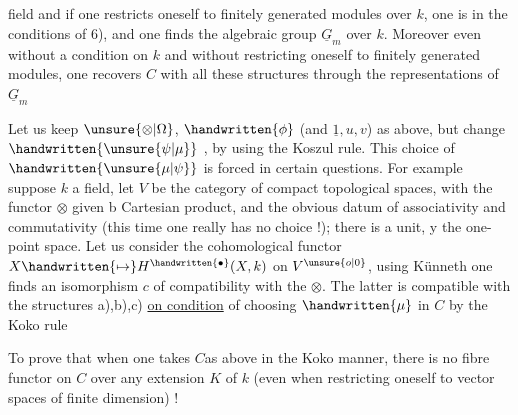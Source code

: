 

field and if one restricts oneself to finitely generated modules over $k$, one is in the conditions of 6), and one finds the algebraic group $\underline{G}_m$ over $k$. Moreover even without a condition on $k$ and without restricting oneself to finitely generated modules, one recovers $C$ with all these structures through the representations of $\underline{G}_m$\handwritten{\unsure{!|/}}

Let us keep $\unsure{\otimes|\Omega}$, $\handwritten{\phi}$ (and $\underline{1},u,v$) as above, but change $\handwritten{\unsure{\psi|\mu}}$ , by  using the Koszul rule. This choice of $\handwritten{\unsure{\mu|\psi}}$ is forced in certain questions. For example suppose $k$ a field,  let $V$ be the category of compact topological spaces, with the functor $\otimes$ given b Cartesian product, and the obvious datum of associativity and commutativity (this time one really has no choice !); there is a unit,  y the one-point space. Let us consider the cohomological functor $X\handwritten{\mapsto}H^{\handwritten{\bullet}}(X,k)$ on $V^{\unsure{o|0}}$, using Künneth one finds an isomorphism $c$ of compatibility with the $\otimes$. The latter is compatible with the structures a),b),c) \uline{on condition} of choosing $\handwritten{\mu}$ in $C$ by the Koko rule\handwritten{!}

To prove that when one takes $C$as above in the Koko manner, there is no fibre functor on $C$ over any extension $K$ of $k$ (even when restricting oneself to vector spaces of finite dimension) !



